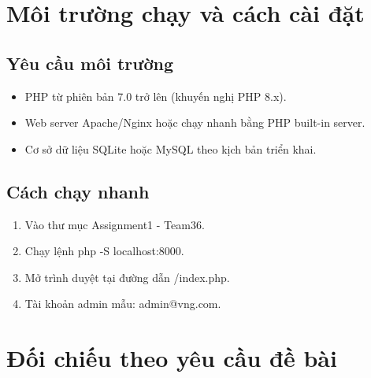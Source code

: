 \documentclass[12pt,a4paper]{article}
\begin{document}
\section{Môi trường chạy và cách cài đặt}

\subsection{Yêu cầu môi trường}
\begin{itemize}
  \item PHP từ phiên bản 7.0 trở lên (khuyến nghị PHP 8.x).
  \item Web server Apache/Nginx hoặc chạy nhanh bằng PHP built-in server.
  \item Cơ sở dữ liệu SQLite hoặc MySQL theo kịch bản triển khai.
\end{itemize}

\subsection{Cách chạy nhanh}
\begin{enumerate}
  \item Vào thư mục Assignment1 - Team36.
  \item Chạy lệnh php -S localhost:8000.
  \item Mở trình duyệt tại đường dẫn /index.php.
  \item Tài khoản admin mẫu: admin@vng.com.
\end{enumerate}

\section{Đối chiếu theo yêu cầu đề bài}
\end{document}
